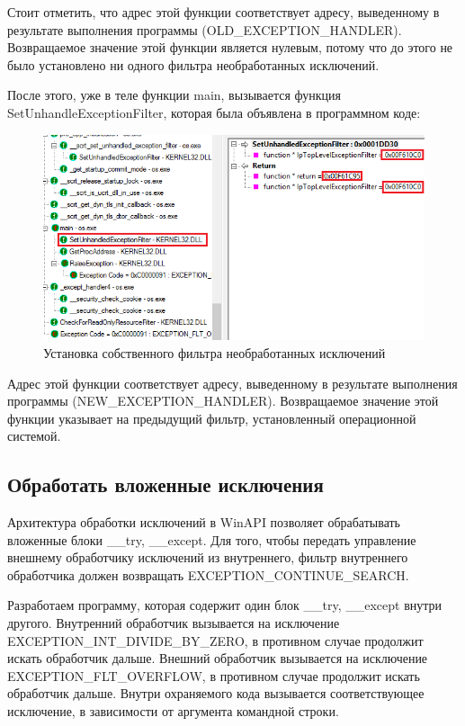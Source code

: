 \documentclass[14pt,a4paper,report]{report}
\begin{document}
Стоит отметить, что адрес этой функции соответствует адресу, выведенному в результате выполнения программы (OLD\_EXCEPTION\_HANDLER). Возвращаемое значение этой функции является нулевым, потому что до этого не было установлено ни одного фильтра необработанных исключений.

После этого, уже в теле функции main, вызывается функция SetUnhandleExceptionFilter, которая была объявлена в программном коде:

\begin{figure}[h!]
	\centering
	\includegraphics[scale = 0.92]{images/5_2.png}
	\caption{Установка собственного фильтра необработанных исключений}
\end{figure}

Адрес этой функции соответствует адресу, выведенному в результате выполнения программы (NEW\_EXC\linebreak EPTION\_HANDLER). Возвращаемое значение этой функции указывает на предыдущий фильтр, установленный операционной системой.

\subsection{Обработать вложенные исключения}

Архитектура обработки исключений в WinAPI позволяет обрабатывать вложенные блоки \_\_try, \_\_except. Для того, чтобы передать управление внешнему обработчику исключений из внутреннего, фильтр внутреннего обработчика должен возвращать EXCEPTION\_CONTINUE\_SEARCH.

Разработаем программу, которая содержит один блок \_\_try, \_\_except внутри другого. Внутренний обработчик вызывается на исключение EXCEPTION\_INT\_DIVIDE\_BY\_ZERO, в противном случае продолжит искать обработчик дальше. Внешний обработчик вызывается на исключение EXCEPTION\_FLT\_OVERFLOW, в противном случае продолжит искать обработчик дальше. Внутри охраняемого кода вызывается соответствующее исключение, в зависимости от аргумента командной строки.
\end{document}
